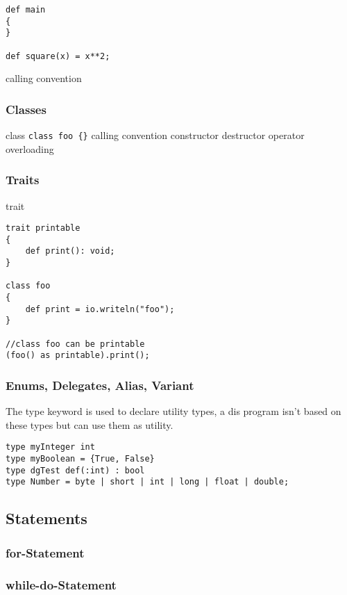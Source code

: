 \begin{lstlisting}
def main
{
}

def square(x) = x**2;
\end{lstlisting}

calling convention

\subsubsection{Classes}
class
\lstinline!class foo {}!
calling convention
constructor
destructor
operator overloading

\subsubsection{Traits}
trait
\begin{lstlisting}
trait printable
{
	def print(): void;
}

class foo
{
	def print = io.writeln("foo");
}

//class foo can be printable
(foo() as printable).print();
\end{lstlisting}

\subsubsection{Enums, Delegates, Alias, Variant}
The type keyword is used to declare utility types, a dis program isn't based on these types but can use them as utility.

\begin{lstlisting}
type myInteger int
type myBoolean = {True, False}
type dgTest def(:int) : bool
type Number = byte | short | int | long | float | double;
\end{lstlisting}


\subsection{Statements}
\subsubsection{for-Statement}
\subsubsection{while-do-Statement}
